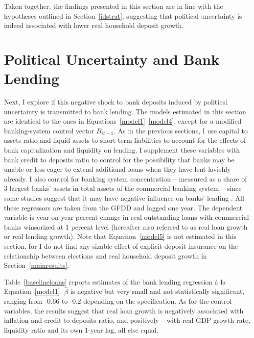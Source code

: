 \documentclass[12pt,a4paper]{article}
\begin{document}
Taken together, the findings presented in this section are in line with the hypotheses outlined in Section~\ref{idstrat}, suggesting that political uncertainty is indeed associated with lower real household deposit growth.

\section{Political Uncertainty and Bank Lending}\label{lendingresults}
Next, I explore if this negative shock to bank deposits induced by political uncertainty is transmitted to bank lending. The models estimated in this section are identical to the ones in Equations~\eqref{model1}--\eqref{model4}, except for a modified banking-system control vector $B_{it-1}$. As in the previous sections, I use capital to assets ratio and liquid assets to short-term liabilities to account for the effects of bank capitalization and liquidity on lending. I supplement these variables with bank credit to deposits ratio to control for the possibility that banks may be unable or less eager to extend additional loans when they have lent lavishly already. I also control for banking system concentration -- measured as a share of 3 largest banks' assets in total assets of the commercial banking system -- since some studies suggest that it may have negative influence on banks' lending \citep[see, for example,][]{beck2004bank, braggion2017nothing}. All these regressors are taken from the GFDD and lagged one year. The dependent variable is year-on-year percent change in real outstanding loans with commercial banks winsorized at 1 percent level (hereafter also referred to as real loan growth or real lending growth). Note that Equation~\eqref{model5} is not estimated in this section, for I do not find any sizable effect of explicit deposit insurance on the relationship between elections and real household deposit growth in Section~\ref{mainresults}.


Table~\ref{baselineloans} reports estimates of the bank lending regression \`a la Equation~\eqref{model1}. $\hat{\beta}$ is negative but very small and not statistically significant, ranging from -0.66 to -0.2 depending on the specification. As for the control variables, the results suggest that real loan growth is negatively associated with inflation and credit to deposits ratio, and positively -- with real GDP growth rate, liquidity ratio and its own 1-year lag, all else equal.
\end{document}
